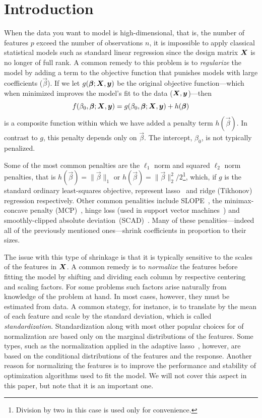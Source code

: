 \section{Introduction}

When the data you want to model is high-dimensional, that is, the number of features \(p\)
exceed the number of observations \(n\), it is impossible to apply classical statistical
models such as standard linear regression since the design matrix \(\boldsymbol X\) is no longer
of full rank. A common remedy to this problem is to \emph{regularize} the model by adding a
term to the objective function that punishes models with large coefficients
(\(\vec\beta\)). If we let \(g(\boldsymbol\beta; \boldsymbol X, \boldsymbol y)\) be the original objective
function---which when minimized improves the model's fit to the data (\(\boldsymbol X, \boldsymbol
y\))---then
\begin{equation}
  \label{eq:general-objective}
  f(\beta_0, \boldsymbol\beta; \boldsymbol X, \boldsymbol y) = g(\beta_0, \boldsymbol\beta; \boldsymbol X, \boldsymbol y) + h(\boldsymbol\beta)
\end{equation}
is a composite function within which we have added a penalty term \(h(\vec\beta)\). In
contrast to \(g\), this penalty depends only on \(\vec{\beta}\). The intercept,
\(\beta_0\), is not typically penalized.

Some of the most common penalties are the \(\ell_1\) norm and squared \(\ell_2\) norm
penalties, that is \(h(\vec\beta) = \lVert \vec\beta \rVert_1\) or \(h(\vec\beta) = \lVert
\vec\beta \rVert_2^2/2\)\footnote{Division by two in this case is used only for
  convenience.}, which, if \(g\) is the standard ordinary least-squares objective, represent
lasso~\citep{tibshirani1996,santosa1986,donoho1994} and ridge (Tikhonov) regression
respectively. Other common penalities include SLOPE~\citep{bogdan2013,bogdan2015}, the
minimax-concave penalty (MCP)~\citep{zhang2010}, hinge loss (used in support vector
machines~\citep{cortes1995}) and smoothly-clipped absolute
deviation~(SCAD)~\citep{fan2001}. Many of these penalities---indeed all of the previously
mentioned ones---shrink coefficients in proportion to their sizes.

The issue with this type of shrinkage is that it is typically sensitive to the scales of
the features in \(\boldsymbol X\). A common remedy is to \emph{normalize} the features before
fitting the model by shifting and dividing each column by respective centering and scaling
factors. For some problems such factors arise naturally from knowledge of the problem at
hand. In most cases, however, they must be estimated from data. A common stategy, for
instance, is to translate by the mean of each feature and scale by the standard deviation,
which is called \emph{standardization}. Standardization along with most other popular
choices for of normalization are based only on the marginal distributions of the features.
Some types, such as the normalization applied in the adaptive lasso~\citep{zou2006},
however, are based on the conditional distributions of the features and the response.
Another reason for normalizing the features is to improve the performance and stability of
optimization algorithms used to fit the model. We will not cover this aspect in this paper,
but note that it is an important one.


